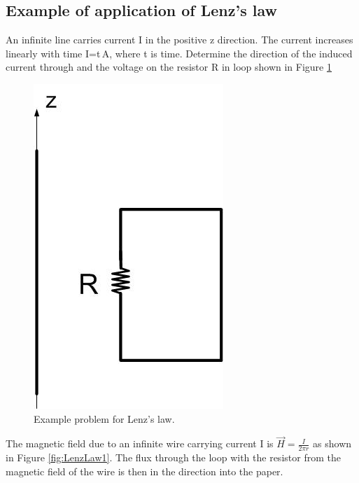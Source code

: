 \documentclass{ximera}
\begin{document}
\begin{example}
\section{Example of application of Lenz's law}

An infinite line carries current I in the positive z direction. The current increases linearly with time I=t\,A, where t is time. Determine the direction of the induced current through and the voltage on the resistor R in loop shown in Figure \ref{fig:LenzLaw}


\begin{figure}[htbp]
\begin{center}
\includegraphics[scale=0.5]{../jpg/Lenzlaw.jpg}
\end{center}
\caption{Example problem for Lenz's law.}
\label{fig:LenzLaw}
\end{figure}


\begin{explanation}

The magnetic field due to an infinite wire carrying current I is $\vec{H}=\frac{I}{2 \pi r}$ as shown in Figure \ref{fig:LenzLaw1}.  The flux through the loop with the resistor from the magnetic field of the wire is then in the direction into the paper.




\end{explanation}
\end{example}
\end{document}
